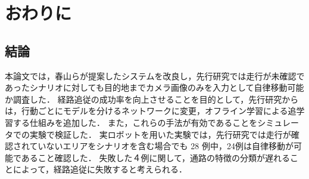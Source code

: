 \chapter{おわりに}
\label{chap:end}
\section{結論}
本論文では，春山らが提案したシステムを改良し，先行研究では走行が未確認であったシナリオに対しても目的地までカメラ画像のみを入力として自律移動可能か調査した．
経路追従の成功率を向上させることを目的として，先行研究からは，行動ごとにモデルを分けるネットワークに変更，オフライン学習による追学習する仕組みを追加した．
また，これらの手法が有効であることをシミュレータでの実験で検証した．
実ロボットを用いた実験では，先行研究では走行が確認されていないエリアをシナリオを含む場合でも 28 例中，24例は自律移動が可能であること確認した．
失敗した４例に関して，通路の特徴の分類が遅れることによって，経路追従に失敗すると考えられる．